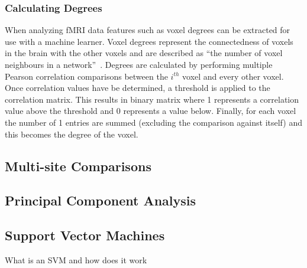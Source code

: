 \documentclass{article} %
\begin{document}
\subsubsection{Calculating Degrees}
When analyzing fMRI data features such as voxel degrees can be extracted for
use with a machine learner. Voxel degrees represent the connectedness of
voxels in the brain with the other voxels and are described as ``the number
of voxel neighbours in a network''~\cite{Rish_2013}. Degrees are calculated 
by performing
multiple Pearson correlation comparisons between the $i^{th}$ voxel and every
other voxel. Once correlation values have be determined, a threshold is
applied to the correlation matrix. This results in binary matrix where 1 
represents a correlation value above the threshold and 0 represents a value 
below. Finally, for each voxel the number of 1 entries are summed (excluding 
the comparison against itself) and this becomes the degree of the voxel.


\subsection{Multi-site Comparisons}

\subsection{Principal Component Analysis}

\subsection{Support Vector Machines}
What is an SVM and how does it work
\end{document}
